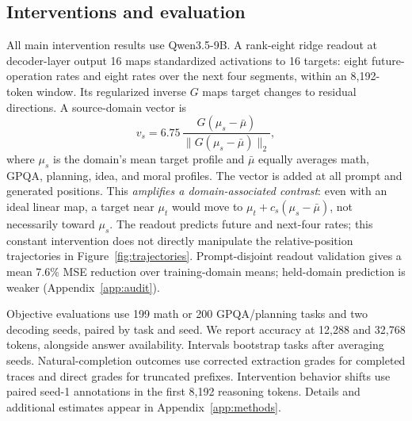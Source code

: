 \subsection{Interventions and evaluation}
All main intervention results use Qwen3.5-9B. A rank-eight ridge readout at decoder-layer output 16 maps standardized activations to 16 targets: eight future-operation rates and eight rates over the next four segments, within an 8,192-token window. Its regularized inverse $G$ maps target changes to residual directions. A source-domain vector is
\begin{equation}
v_s=6.75\,\frac{G(\mu_s-\bar\mu)}{\|G(\mu_s-\bar\mu)\|_2},
\label{eq:transfer}
\end{equation}
where $\mu_s$ is the domain's mean target profile and $\bar\mu$ equally averages math, GPQA, planning, idea, and moral profiles. The vector is added at all prompt and generated positions. This \emph{amplifies a domain-associated contrast}: even with an ideal linear map, a target near $\mu_t$ would move to $\mu_t+c_s(\mu_s-\bar\mu)$, not necessarily toward $\mu_s$. The readout predicts future and next-four rates; this constant intervention does not directly manipulate the relative-position trajectories in Figure~\ref{fig:trajectories}. Prompt-disjoint readout validation gives a mean 7.6\% MSE reduction over training-domain means; held-domain prediction is weaker (Appendix~\ref{app:audit}).

Objective evaluations use 199 math or 200 GPQA/planning tasks and two decoding seeds, paired by task and seed. We report accuracy at 12,288 and 32,768 tokens, alongside answer availability. Intervals bootstrap tasks after averaging seeds. Natural-completion outcomes use corrected extraction grades for completed traces and direct grades for truncated prefixes. Intervention behavior shifts use paired seed-1 annotations in the first 8,192 reasoning tokens. Details and additional estimates appear in Appendix~\ref{app:methods}.

